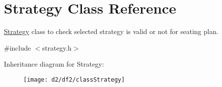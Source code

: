 \hypertarget{classStrategy}{\section{\-Strategy \-Class \-Reference}
\label{d2/df2/classStrategy}
}


\hyperlink{classStrategy}{\-Strategy} class to check selected strategy is valid or not for seating plan.  




{\ttfamily \#include $<$strategy.\-h$>$}

\-Inheritance diagram for \-Strategy\-:\begin{figure}[H]
\begin{center}
\leavevmode
\texttt{[image: d2/df2/classStrategy]}
\end{center}
\end{figure}
